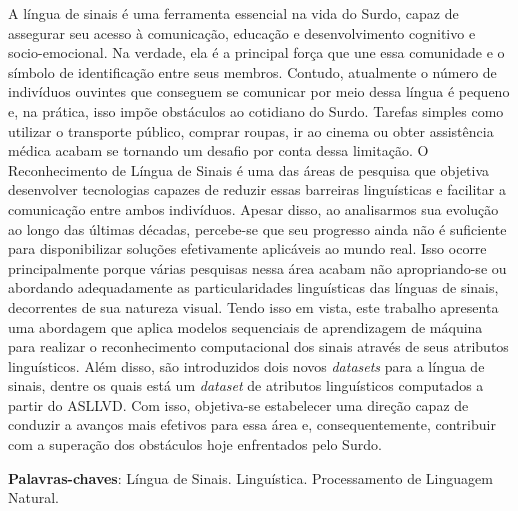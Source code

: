 \begin{resumo}[Resumo]
  \noindent
  A língua de sinais é uma ferramenta essencial na vida do Surdo, capaz de assegurar seu acesso à comunicação, educação e desenvolvimento cognitivo e socio-emocional.
  Na verdade, ela é a principal força que une essa comunidade e o símbolo de identificação entre seus membros.
  Contudo, atualmente o número de indivíduos ouvintes que conseguem se comunicar por meio dessa língua é pequeno e, na prática, isso impõe obstáculos ao cotidiano do Surdo.
  Tarefas simples como utilizar o transporte público, comprar roupas, ir ao cinema ou obter assistência médica acabam se tornando um desafio por conta dessa limitação.
  O Reconhecimento de Língua de Sinais é uma das áreas de pesquisa que objetiva desenvolver tecnologias capazes de reduzir essas barreiras linguísticas e facilitar a comunicação entre ambos indivíduos.
  Apesar disso, ao analisarmos sua evolução ao longo das últimas décadas, percebe-se que seu progresso ainda não é suficiente para disponibilizar soluções efetivamente aplicáveis ao mundo real.
  Isso ocorre principalmente porque várias pesquisas nessa área acabam não apropriando-se ou abordando adequadamente as particularidades linguísticas das línguas de sinais, decorrentes de sua natureza visual.
  Tendo isso em vista, este trabalho apresenta uma abordagem que aplica modelos sequenciais de aprendizagem de máquina para realizar o reconhecimento computacional dos sinais através de seus atributos linguísticos. Além disso, são introduzidos dois novos \textit{datasets} para a língua de sinais, dentre os quais está um \textit{dataset} de atributos linguísticos computados a partir do ASLLVD.
  Com isso, objetiva-se estabelecer uma direção capaz de conduzir a avanços mais efetivos para essa área e, consequentemente, contribuir com a superação dos obstáculos hoje enfrentados pelo Surdo.

  \vspace{\onelineskip}

  \noindent
  \textbf{Palavras-chaves}: Língua de Sinais. Linguística. Processamento de Linguagem Natural.
\end{resumo}



